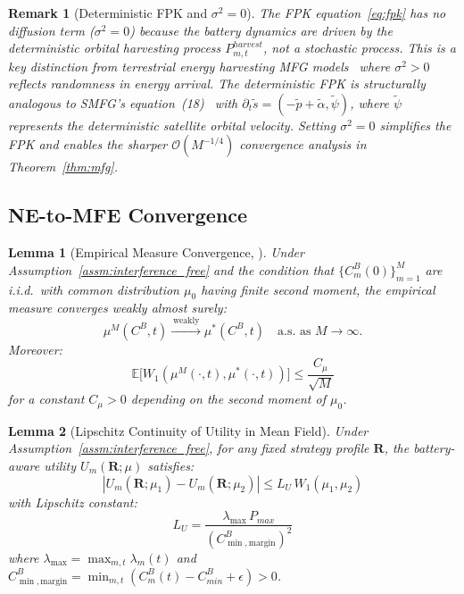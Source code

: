 \documentclass[journal]{IEEEtran}
\newtheorem{lemma}{Lemma}
\newtheorem{remark}{Remark}
\newcommand{\CB}{C^{B}}
\newcommand{\CBmin}{C^{B}_{min}}
\newcommand{\Pmax}{P_{max}}
\newcommand{\bfR}{\mathbf{R}}
\newcommand{\WassDist}{W_{1}}
\begin{document}
\begin{remark}[Deterministic FPK and $\sigma^2=0$]
\label{rem:fpk_deterministic}
The FPK equation~\eqref{eq:fpk} has no diffusion term ($\sigma^2=0$) because the battery dynamics are driven by the deterministic orbital harvesting process $P_{m,t}^{harvest}$, not a stochastic process. This is a key distinction from terrestrial energy harvesting MFG models~\cite{tembine2014risksensitive} where $\sigma^2>0$ reflects randomness in energy arrival. The deterministic FPK is structurally analogous to SMFG's equation~(18)~\cite{wang2023smfg} with $\partial_t\tilde{s} = (-\tilde{p}+\tilde{\alpha},\tilde{\psi})$, where $\tilde{\psi}$ represents the deterministic satellite orbital velocity. Setting $\sigma^2=0$ simplifies the FPK and enables the sharper $\mathcal{O}(M^{-1/4})$ convergence analysis in Theorem~\ref{thm:mfg}.
\end{remark}

\subsection{NE-to-MFE Convergence}

\begin{lemma}[Empirical Measure Convergence,
{\cite{fournier2015wasserstein}}]
\label{lem:emp_conv}
Under Assumption~\ref{assm:interference_free} and the condition that $\{\CB_m(0)\}_{m=1}^M$ are i.i.d.\ with common distribution $\mu_0$ having finite second moment, the empirical measure converges weakly almost surely:
\begin{equation}
    \mu^M(\CB,t)
    \xrightarrow{\,\mathrm{weakly}\,}
    \mu^*(\CB,t)
    \quad\text{a.s.\ as }M\to\infty.
\end{equation}
Moreover:
\begin{equation}
    \mathbb{E}\bigl[
    \WassDist(\mu^M(\cdot,t),\mu^*(\cdot,t))
    \bigr]
    \leq \frac{C_\mu}{\sqrt{M}}
    \label{eq:emp_rate}
\end{equation}
for a constant $C_\mu>0$ depending on the second moment of $\mu_0$.
\end{lemma}


\begin{lemma}[Lipschitz Continuity of Utility
in Mean Field]
\label{lem:lipschitz}
Under Assumption~\ref{assm:interference_free}, for any fixed strategy profile $\bfR$, the battery-aware utility $U_m(\bfR;\mu)$ satisfies:
\begin{equation}
    |U_m(\bfR;\mu_1) - U_m(\bfR;\mu_2)|
    \leq L_U\,\WassDist(\mu_1,\mu_2)
    \label{eq:lipschitz_cond}
\end{equation}
with Lipschitz constant:
\begin{equation}
    L_U = \frac{\lambda_{\max}\,\Pmax}
    {(C^B_{\min,\mathrm{margin}})^2}
    \label{eq:lipschitz_const}
\end{equation}
where $\lambda_{\max} = \max_{m,t}\lambda_m(t)$ and $C^B_{\min,\mathrm{margin}} = \min_{m,t}(\CB_m(t) - \CBmin + \epsilon) > 0$.
\end{lemma}
\end{document}

